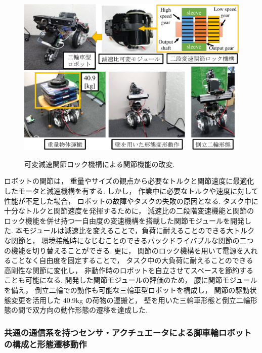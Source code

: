 \documentclass[twocolumn]{d-abst}
\begin{document}
\begin{figure}[tbh]
 \begin{center}
  \begin{minipage}{1.0\columnwidth}
   \includegraphics[width=\columnwidth]{3_module.pdf}
   \caption{可変減速関節ロック機構による関節機能の改変.}
  \end{minipage}
  \label{figure:nowprinting}
 \end{center}
\end{figure}

ロボットの関節は， 重量やサイズの観点から必要なトルクと関節速度に最適化したモータと減速機構を有する. しかし， 作業中に必要なトルクや速度に対して性能が不足した場合， ロボットの故障やタスクの失敗の原因となる. タスク中に十分なトルクと関節速度を発揮するために， 減速比の二段階変速機能と関節の ロック機能を併せ持つ一自由度の変速機構を搭載した関節モジュールを開発した. 本モジュールは減速比を変えることで，負荷に耐えることのできる大トルクな関節と， 環境接触時になじむことのできるバックドライバブルな関節の二つの機能を切り替えることができる. 更に， 関節のロック機構を用いて電源を入れることなく自由度を固定することで， タスク中の大負荷に耐えることのできる高剛性な関節に変化し， 非動作時のロボットを自立させてスペースを節約することも可能になる. 開発した関節モジュールの評価のため， 腰に関節モジュールを備え， 倒立二輪での動作も可能な三輪車型ロボットを構成し， 関節の駆動状態変更を活用した 40.9kg の荷物の運搬と， 壁を用いた三輪車形態と倒立二輪形態の間で双方向の動作形態の遷移を達成した.

\subsubsection{共通の通信系を持つセンサ・アクチュエータによる脚車輪ロボットの構成と形態遷移動作}
\end{document}
